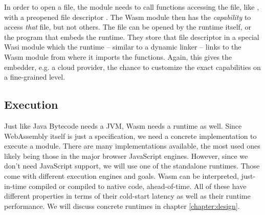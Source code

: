 In order to open a file, the module needs to call functions accessing the file, like , with a preopened file descriptor \cite{Clark2019}. The Wasm module then has the \emph{capability} to access \emph{that} file, but not others. The file can be opened by the runtime itself, or the program that embeds the runtime. They store that file descriptor in a special Wasi module which the runtime -- similar to a dynamic linker -- links to the Wasm module from where it imports the functions. Again, this gives the embedder, e.g. a cloud provider, the chance to customize the exact capabilities on a fine-grained level.


\subsection{Execution}

Just like Java Bytecode needs a JVM, Wasm needs a runtime as well. Since WebAssembly itself is just a specification, we need a concrete implementation to execute a module. There are many implementations available, the most used ones likely being those in the major browser JavaScript engines. However, since we don't need JavaScript support, we will use one of the standalone runtimes. Those come with different execution engines and goals. Wasm can be interpreted, just-in-time compiled or compiled to native code, ahead-of-time. All of these have different properties in terms of their cold-start latency as well as their runtime performance. We will discuss concrete runtimes in chapter \ref{chapter:design}.
